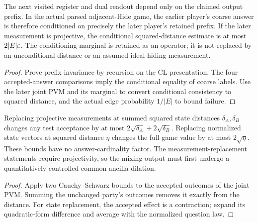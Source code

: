 \begin{lemma}
\label{lem:intro-adjacent-hiding}
\leanok
The next visited register and dual readout depend only on the claimed
output prefix. In the actual parsed adjacent-Hide game, the earlier player's
coarse answer is therefore conditioned on precisely the later player's
retained prefix. If the later measurement is projective, the conditional
squared-distance estimate is at most $2|E|\varepsilon$. The conditioning marginal
is retained as an operator; it is not replaced by an unconditional distance
or an assumed ideal hiding measurement.
\end{lemma}
\begin{proof}
\leanok
Prove prefix invariance by recursion on the CL presentation. The four
accepted-answer comparisons imply the conditional equality of coarse labels.
Use the later joint PVM and its marginal to convert conditional consistency
to squared distance, and the actual edge probability $1/|E|$ to bound failure.
\end{proof}

\begin{lemma}
\label{lem:intro-value-stability}
\leanok
Replacing projective measurements at summed squared state distances
$\delta_A,\delta_B$ changes any test acceptance by at most
$2\sqrt{\delta_A}+2\sqrt{\delta_B}$. Replacing normalized state vectors at
squared distance $\eta$ changes the full game value by at most $2\sqrt{\eta}$.
These bounds have no answer-cardinality factor. The measurement-replacement
statements require projectivity, so the mixing output must first undergo a
quantitatively controlled common-ancilla dilation.
\end{lemma}
\begin{proof}
\leanok
Apply two Cauchy--Schwarz bounds to the accepted outcomes of the joint PVM.
Summing the unchanged party's outcomes removes it exactly from the distance.
For state replacement, the accepted effect is a contraction; expand its
quadratic-form difference and average with the normalized question law.
\end{proof}

